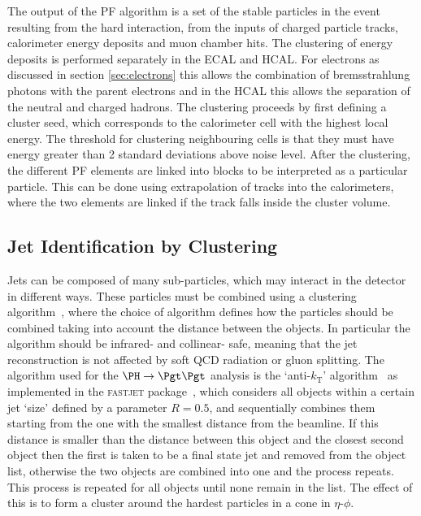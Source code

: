 The output of the \ac{PF} algorithm is a set of the stable particles in the event
resulting from the hard interaction, from the inputs of charged particle tracks,
calorimeter energy deposits and muon chamber hits. The clustering of energy
deposits is performed separately in the \ac{ECAL} and \ac{HCAL}. For electrons
as discussed in section \ref{sec:electrons} this allows the combination of
bremsstrahlung photons with the parent electrons and in the \ac{HCAL} this
allows the separation of the neutral and charged hadrons. The clustering
proceeds by first defining a cluster seed, which corresponds to the calorimeter
cell with the highest local energy. The threshold for clustering neighbouring
cells is that they must have energy greater than 2 standard deviations above
noise level. After the clustering, the different \ac{PF} elements are linked into
blocks to be interpreted as a particular particle. This can be done using
extrapolation of tracks into the calorimeters, where the two elements are linked
if the track falls inside the cluster volume.

\subsection{Jet Identification by Clustering}
\label{sec:jetID}

Jets can be composed of many sub-particles, which may interact in the detector
in different ways. These particles must be combined using a clustering
algorithm~\cite{Salam:2009jx}, where the choice of algorithm defines how the particles should be combined
taking into account the distance between the objects. In particular the
algorithm should be infrared- and collinear- safe, meaning that the jet
reconstruction is not affected by soft QCD radiation or gluon splitting.
The algorithm used for the $\PH\to\Pgt\Pgt$ analysis is the
`anti-$k_{\text{T}}$' algorithm~\cite{Cacciari:2008gp} as implemented in
the \textsc{fastjet} package~\cite{Cacciari:fastjet1}, which considers all 
objects within a certain jet `size' defined by a parameter $R=0.5$, and 
sequentially combines them starting from the one with the
smallest distance from the beamline. If this distance is smaller than the
distance between this object and the closest second object then the first is
taken to be a final state jet and removed from the object list,
otherwise the two objects are combined into one and the process repeats. 
This process is repeated for all objects until none remain in the list. The effect of this
is to form a cluster around the hardest particles in a cone in $\eta$-$\phi$.

